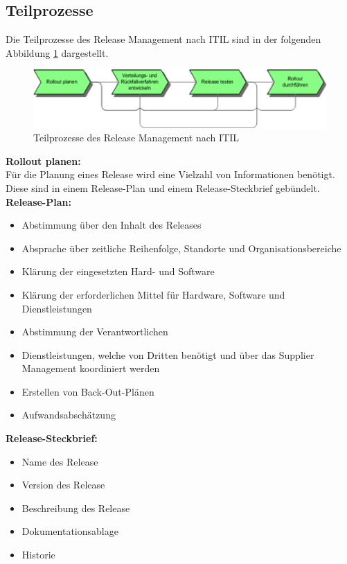 \subsection{Teilprozesse}
Die Teilprozesse des Release Management nach ITIL sind in der folgenden Abbildung \ref{fig:tp} dargestellt. 
\begin{figure}[H]
	\includegraphics[width=\textwidth]{img/Teilprozesse.png}
	\caption{Teilprozesse des Release Management nach ITIL \cite{wiki-it}}
	\label{fig:tp}
\end{figure}
\textbf{Rollout planen:}
\\
Für die Planung eines Release wird eine Vielzahl von Informationen benötigt. Diese sind in einem Release-Plan und einem Release-Steckbrief gebündelt. \cite{rm-schiefer-erik}
\\
\textbf{Release-Plan:}
\begin{itemize}
	\item Abstimmung über den Inhalt des Releases
	\item Absprache über zeitliche Reihenfolge, Standorte und Organisationsbereiche
	\item Klärung der eingesetzten Hard- und Software
	\item Klärung der erforderlichen Mittel für Hardware, Software und Dienstleistungen
	\item Abstimmung der Verantwortlichen
	\item Dienstleistungen, welche von Dritten benötigt und über das Supplier Management koordiniert werden
	\item Erstellen von Back-Out-Plänen
	\item Aufwandsabschätzung
\end{itemize}
\textbf{Release-Steckbrief:}
\begin{itemize}
	\item Name des Release
	\item Version des Release
	\item Beschreibung des Release
	\item Dokumentationsablage
	\item Historie
\end{itemize}



